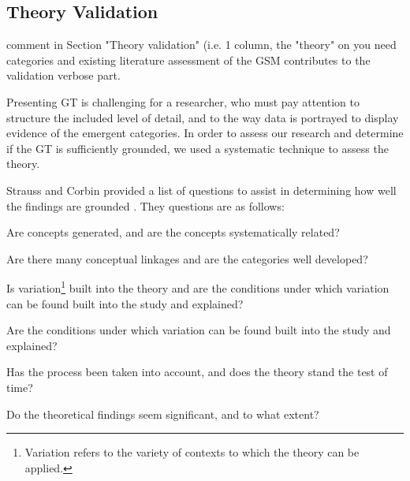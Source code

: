 \documentclass[12pt,journal,compsoc]{../sty/IEEEtran}
\begin{document}
\begin{table}[!t]
\subsection{Theory Validation} \label{rm:val} %
comment in Section "Theory validation" (i.e. %
1 column,  %
the  %
"theory" on  %
you need  %
categories and existing literature %
assessment of the GSM %
contributes to the validation  %
verbose part.


Presenting GT is challenging for a researcher, who must pay attention to
structure the included level of detail, and to the way data is portrayed to
display evidence of the emergent categories.  In order to assess our research
and determine if the GT is sufficiently grounded, we used a systematic technique
to assess the theory.

Strauss and Corbin provided a list of questions to assist in  determining how
well the findings are grounded \cite{Strauss1998}. They  questions are as
follows:

\par\vspace {0.4cm} \begin{compactenum} \item Are concepts generated, and are
the concepts systematically related? \item Are there many conceptual linkages
and are the categories well developed? \item Is variation\footnote{Variation
refers to the variety of contexts to  which the theory can be applied.} built
into the theory and are the conditions  under which variation can be found built
into the study and explained? \item Are the conditions under which variation can
be found built into the  study and explained? \item Has the process been taken
into account, and does the theory stand the  test of time? \item Do the
theoretical findings seem significant, and to what extent? \end{compactenum}
\par\vspace {0.4cm}


\end{table}
\end{document}
